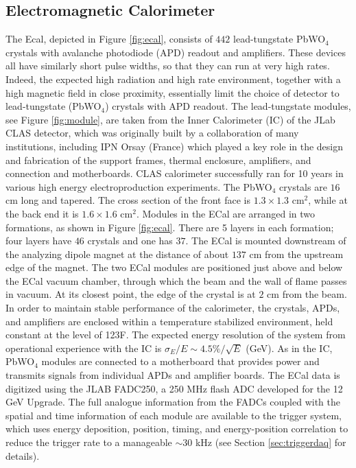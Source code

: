 \subsection{Electromagnetic Calorimeter} 
\label{sec:ecal}

The Ecal, depicted in Figure \ref{fig:ecal}, consists of $442$ lead-tungstate PbWO$_4$ crystals with avalanche photodiode (APD) readout and amplifiers. These devices all have similarly short pulse widths, so that they can run at very high rates. Indeed, the expected high radiation and high rate environment, together with a high magnetic field in close proximity, essentially limit the choice of detector to lead-tungstate (PbWO$_4$) crystals with APD readout. The lead-tungstate modules, see Figure \ref{fig:module}, are taken from the Inner Calorimeter (IC) of the JLab CLAS detector, which was originally built by a collaboration of many institutions, including IPN Orsay (France) which played a key role in the design and fabrication of the support frames, thermal enclosure, amplifiers, and connection and motherboards. CLAS calorimeter successfully ran for 10 years in various high energy electroproduction experiments. The PbWO$_4$ crystals are $16$ cm long and tapered. The cross section of the front face is $1.3\times 1.3$ cm$^2$, while at the back end it is $1.6\times 1.6$ cm$^2$. Modules in the ECal are arranged in two formations, as shown in Figure \ref{fig:ecal}. There are 5 layers in each formation; four layers have $46$ crystals and one has $37$. The ECal is mounted downstream of the analyzing dipole magnet at the distance of about $137$ cm from the upstream edge of the magnet. The two ECal modules are positioned just above and below the ECal vacuum chamber, through which the beam and the wall of flame passes in vacuum. At its closest point, the edge of the crystal is at $2$ cm from the beam. In order to maintain stable performance of the calorimeter, the crystals, APDs, and amplifiers are enclosed within a temperature stabilized environment, held constant at the level of 1\!\char23F. The expected energy resolution of the system from operational experience with the IC is $\sigma_E/E \sim 4.5\%/\sqrt{E}$ (GeV). As in the IC, PbWO$_4$ modules are connected to a motherboard that provides power and transmits signals from individual APDs and amplifier boards. The ECal data is digitized using the JLAB FADC250, a 250 MHz flash ADC developed for the 12 GeV Upgrade. The full analogue information from the FADCs coupled with the spatial and time information of each module are available to the trigger system, which uses energy deposition, position, timing, and energy-position correlation to reduce the trigger rate to a manageable $\sim 30$ kHz (see Section \ref{sec:triggerdaq} for details).


